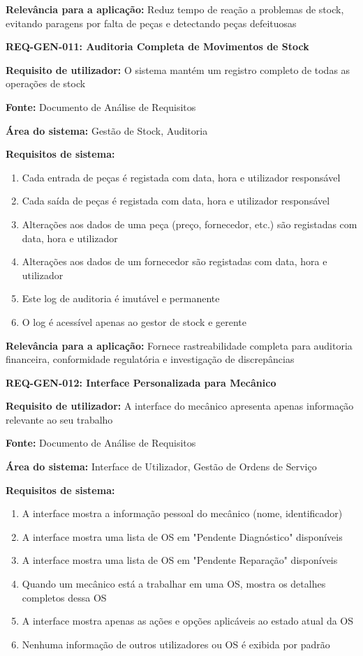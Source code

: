 \documentclass[11pt,a4paper]{article}
\newcommand{\reqheader}[1]{{\noindent\large\bfseries\color{sectionblue}#1}\par\vspace{0.3cm}}
\newcommand{\reqfield}[2]{{\noindent\textbf{#1:} #2}\par\vspace{0.2cm}}
\begin{document}
\reqfield{Relevância para a aplicação}{Reduz tempo de reação a problemas de stock, evitando paragens por falta de peças e detectando peças defeituosas}

\vspace{0.8cm}

\reqheader{REQ-GEN-011: Auditoria Completa de Movimentos de Stock}

\reqfield{Requisito de utilizador}{O sistema mantém um registro completo de todas as operações de stock}

\reqfield{Fonte}{Documento de Análise de Requisitos}

\reqfield{Área do sistema}{Gestão de Stock, Auditoria}

\reqfield{Requisitos de sistema}{
	\begin{enumerate}
		\item Cada entrada de peças é registada com data, hora e utilizador responsável
		\item Cada saída de peças é registada com data, hora e utilizador responsável
		\item Alterações aos dados de uma peça (preço, fornecedor, etc.) são registadas com data, hora e utilizador
		\item Alterações aos dados de um fornecedor são registadas com data, hora e utilizador
		\item Este log de auditoria é imutável e permanente
		\item O log é acessível apenas ao gestor de stock e gerente
	\end{enumerate}
}

\reqfield{Relevância para a aplicação}{Fornece rastreabilidade completa para auditoria financeira, conformidade regulatória e investigação de discrepâncias}

\vspace{0.8cm}

\reqheader{REQ-GEN-012: Interface Personalizada para Mecânico}

\reqfield{Requisito de utilizador}{A interface do mecânico apresenta apenas informação relevante ao seu trabalho}

\reqfield{Fonte}{Documento de Análise de Requisitos}

\reqfield{Área do sistema}{Interface de Utilizador, Gestão de Ordens de Serviço}

\reqfield{Requisitos de sistema}{
	\begin{enumerate}
		\item A interface mostra a informação pessoal do mecânico (nome, identificador)
		\item A interface mostra uma lista de OS em "Pendente Diagnóstico" disponíveis
		\item A interface mostra uma lista de OS em "Pendente Reparação" disponíveis
		\item Quando um mecânico está a trabalhar em uma OS, mostra os detalhes completos dessa OS
		\item A interface mostra apenas as ações e opções aplicáveis ao estado atual da OS
		\item Nenhuma informação de outros utilizadores ou OS é exibida por padrão
	\end{enumerate}
}
\end{document}
